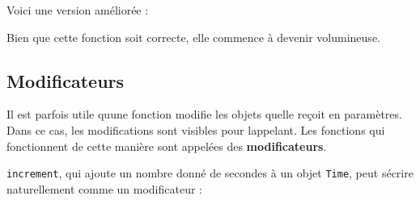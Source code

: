 Voici une version améliorée :

\begin{Shaded}
\begin{Highlighting}[]
     \OperatorTok{=}
    \OperatorTok{=}\OperatorTok{+}
    \OperatorTok{=}\OperatorTok{+}
    \OperatorTok{=}\OperatorTok{+}

     \OperatorTok{\textgreater{}=} \NormalTok{:}
        \OperatorTok{{-}=} 
        \OperatorTok{+=} 

     \OperatorTok{\textgreater{}=} \NormalTok{:}
        \OperatorTok{{-}=} 
        \OperatorTok{+=} 

     
\end{Highlighting}
\end{Shaded}

Bien que cette fonction soit correcte, elle commence à devenir
volumineuse.

\hypertarget{modificateurs}{%
\subsection{Modificateurs}\label{modificateurs}}

Il est parfois utile qu\textquotesingle une fonction modifie les objets
qu\textquotesingle elle reçoit en paramètres. Dans ce cas, les
modifications sont visibles pour l\textquotesingle appelant. Les
fonctions qui fonctionnent de cette manière sont appelées des
\textbf{modificateurs}.

\texttt{increment}, qui ajoute un nombre donné de secondes à un objet
\texttt{Time}, peut s\textquotesingle écrire naturellement comme un
modificateur :

\begin{Shaded}
\begin{Highlighting}[]
\OperatorTok{+=}

    \OperatorTok{\textgreater{}=} \NormalTok{:}
\OperatorTok{{-}=} 
\OperatorTok{+=} 

    \OperatorTok{\textgreater{}=} \NormalTok{:}
\OperatorTok{{-}=} 
\OperatorTok{+=} 
\end{Highlighting}
\end{Shaded}

